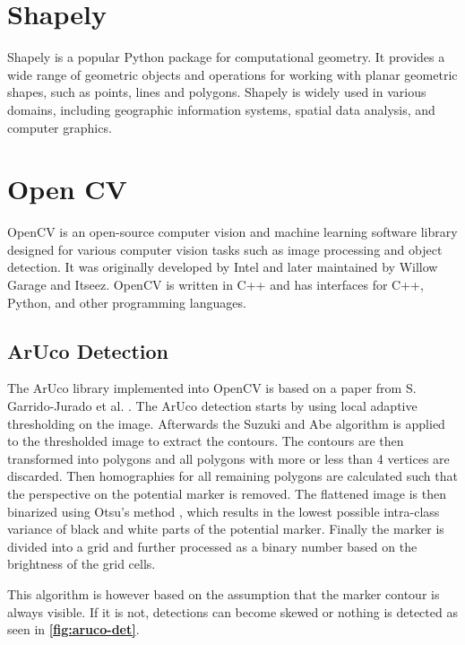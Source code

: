 \documentclass[10pt]{book}
\newcommand{\figureref}[1]{\textbf{\autoref{#1}}}
\begin{document}
\section{Shapely} %

Shapely is a popular Python package for computational geometry. It provides a wide range of geometric objects and operations for working with planar geometric shapes, such as points, lines and polygons. Shapely is widely used in various domains, including geographic information systems, spatial data analysis, and computer graphics.

\section{Open CV}

\ac{OpenCV} is an open-source computer vision and machine learning software library designed for various computer vision tasks such as image processing and object detection. It was originally developed by Intel and later maintained by Willow Garage and Itseez. \ac{OpenCV} is written in C++ and has interfaces for C++, Python, and other programming languages.

\subsection{ArUco Detection}
\label{sec:aruco_det}

The \ac{ArUco} library implemented into \ac{OpenCV} is based on a paper from S. Garrido-Jurado et al. \cite{garrido2014automatic}. The \ac{ArUco} detection starts by using local adaptive thresholding on the image. Afterwards the Suzuki
and Abe algorithm \cite{SUZUKI198532} is applied to the thresholded image to extract the contours. The contours are then transformed into polygons \cite{douglas1973algorithms} and all polygons with more or less than 4 vertices are discarded. Then homographies for all remaining polygons are calculated such that the perspective on the potential marker is removed. The flattened image is then binarized using Otsu's method \cite{4310076}, which results in the lowest possible intra-class variance of black and white parts of the potential marker. Finally the marker is divided into a grid and further processed as a binary number based on the brightness of the grid cells.

This algorithm is however based on the assumption that the marker contour is always visible. If it is not, detections can become skewed or nothing is detected as seen in \figureref{fig:aruco-det}.
\end{document}
